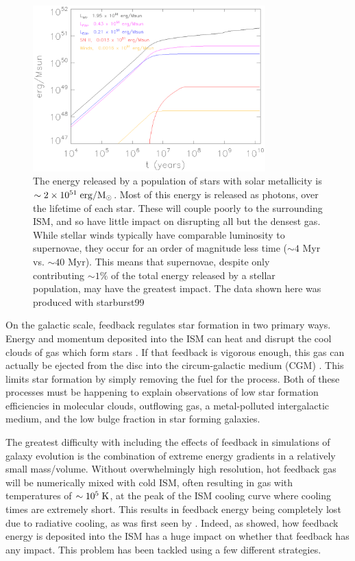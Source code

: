 \begin{figure}
    \includegraphics[width=0.8\textwidth]{FB_budget.ps}
    \caption[Stellar feedback energy budget]{The energy released by a population
    of stars with solar metallicity is $\sim 2\times10^{51}\;\rm{erg/M_\odot}$.
    Most of this energy is released as photons, over the lifetime of each star.
    These will couple poorly to the surrounding ISM, and so have little impact
    on disrupting all but the densest gas.  While stellar winds typically have
    comparable luminosity to supernovae, they occur for an order of
    magnitude less time ($\sim4$ Myr vs. $\sim40$ Myr).  This means that
    supernovae, despite only contributing $\sim1\%$ of the total energy released
    by a stellar population, may have the greatest impact.  The data shown here was
    produced with {\sc starburst99} \citep{Leitherer1999}}
\end{figure}

On the galactic scale, feedback regulates star formation in two primary ways.
Energy and momentum deposited into the ISM can heat and disrupt the cool clouds
of gas which form stars \citep{Rogers2013}.  If that feedback is vigorous
enough, this gas can actually be ejected from the disc into the circum-galactic
medium (CGM) \citep{Larson1974,Heckman1987,Hopkins2012b}.  This limits star
formation by simply removing the fuel for the process.  Both of these processes
must be happening to explain observations of low star formation efficiencies in
molecular clouds, outflowing gas, a metal-polluted intergalactic medium, and the
low bulge fraction in star forming galaxies.

The greatest difficulty with including the effects of feedback in simulations of
galaxy evolution is the combination of extreme energy gradients in a relatively
small mass/volume.  Without overwhelmingly high resolution, hot feedback gas
will be numerically mixed with cold ISM, often resulting in gas with
temperatures of $\sim10^5\;\rm{K}$, at the peak of the ISM cooling curve where
cooling times are extremely short.  This results in feedback energy being
completely lost due to radiative cooling, as was first seen by \citet{Katz1992}.
Indeed, as \citet{Thacker2000} showed, how feedback energy is deposited into the
ISM has a huge impact on whether that feedback has any impact.  This problem has
been tackled using a few different strategies.  

